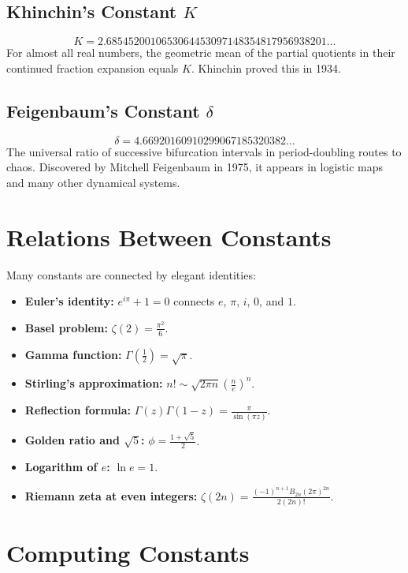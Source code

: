 \subsection{Khinchin's Constant $K$}
\[
K = 2.6854520010653064453097148354817956938201\dots
\]
For almost all real numbers, the geometric mean of the partial quotients in their continued fraction expansion equals $K$. Khinchin proved this in 1934.

\subsection{Feigenbaum's Constant $\delta$}
\[
\delta = 4.66920160910299067185320382\dots
\]
The universal ratio of successive bifurcation intervals in period-doubling routes to chaos. Discovered by Mitchell Feigenbaum in 1975, it appears in logistic maps and many other dynamical systems.

\section{Relations Between Constants}

Many constants are connected by elegant identities:

\begin{itemize}
    \item \textbf{Euler's identity:} $e^{i\pi} + 1 = 0$ connects $e$, $\pi$, $i$, $0$, and $1$.
    \item \textbf{Basel problem:} $\zeta(2) = \frac{\pi^2}{6}$.
    \item \textbf{Gamma function:} $\Gamma\left(\frac{1}{2}\right) = \sqrt{\pi}$.
    \item \textbf{Stirling's approximation:} $n! \sim \sqrt{2\pi n}\left(\frac{n}{e}\right)^n$.
    \item \textbf{Reflection formula:} $\Gamma(z)\Gamma(1-z) = \frac{\pi}{\sin(\pi z)}$.
    \item \textbf{Golden ratio and $\sqrt{5}$:} $\phi = \frac{1+\sqrt{5}}{2}$.
    \item \textbf{Logarithm of $e$:} $\ln e = 1$.
    \item \textbf{Riemann zeta at even integers:} $\zeta(2n) = \frac{(-1)^{n+1}B_{2n}(2\pi)^{2n}}{2(2n)!}$.
\end{itemize}

\section{Computing Constants}

